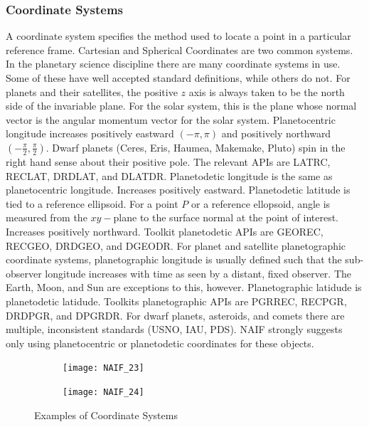 \documentclass[crop=false,class=book]{standalone}
\begin{document}
\subsubsection{Coordinate Systems}
A coordinate system specifies the method used to locate a point in a particular reference frame. Cartesian and Spherical Coordinates are two common systems. In the planetary science discipline there are many coordinate systems in use. Some of these have well accepted standard definitions, while others do not. For planets and their satellites, the positive $z$ axis is always taken to be the north side of the invariable plane. For the solar system, this is the plane whose normal vector is the angular momentum vector for the solar system. Planetocentric longitude increases positively eastward $(-\pi, \pi)$ and positively northward $(-\frac{\pi}{2},\frac{\pi}{2})$. Dwarf planets (Ceres, Eris, Haumea, Makemake, Pluto) spin in the right hand sense about their positive pole. The relevant APIs are LATRC, RECLAT, DRDLAT, and DLATDR. Planetodetic longitude is the same as planetocentric longitude. Increases positively eastward. Planetodetic latitude is tied to a reference ellipsoid. For a point $P$ or a reference ellopsoid, angle is measured from the $xy-$plane to the surface normal at the point of interest. Increases positively northward. Toolkit planetodetic APIs are GEOREC, RECGEO, DRDGEO, and DGEODR. For planet and satellite planetographic coordinate systems, planetographic longitude is usually defined such that the sub-observer longitude increases with time as seen by a distant, fixed observer. The Earth, Moon, and Sun are exceptions to this, however. Planetographic latidude is planetodetic latidude. Toolkits planetographic APIs are PGRREC, RECPGR, DRDPGR, and DPGRDR. For dwarf planets, asteroids, and comets there are multiple, inconsistent standards (USNO, IAU, PDS). NAIF strongly suggests only using planetocentric or planetodetic coordinates for these objects. 
\begin{figure}[H]
    \centering
    \begin{subfigure}[b]{0.49\textwidth}
    \texttt{[image: NAIF\_23]}
    \end{subfigure}
    \begin{subfigure}[b]{0.49\textwidth}
    \texttt{[image: NAIF\_24]}
    \end{subfigure}
    \caption{Examples of Coordinate Systems}
    \label{fig:naif_coordinate_stuff}
\end{figure}
\end{document}
